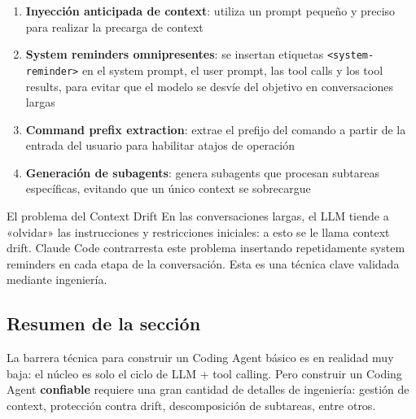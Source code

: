 \begin{enumerate}
    \item \textbf{Inyección anticipada de context}: utiliza un prompt pequeño y preciso para realizar la precarga de context
    \item \textbf{System reminders omnipresentes}: se insertan etiquetas \texttt{<system-reminder>} en el system prompt, el user prompt, las tool calls y los tool results, para evitar que el modelo se desvíe del objetivo en conversaciones largas
    \item \textbf{Command prefix extraction}: extrae el prefijo del comando a partir de la entrada del usuario para habilitar atajos de operación
    \item \textbf{Generación de subagents}: genera subagents que procesan subtareas específicas, evitando que un único context se sobrecargue
\end{enumerate}

\begin{warningbox}{El problema del Context Drift}
En las conversaciones largas, el LLM tiende a «olvidar» las instrucciones y restricciones iniciales: a esto se le llama context drift. Claude Code contrarresta este problema insertando repetidamente system reminders en cada etapa de la conversación. Esta es una técnica clave validada mediante ingeniería.
\end{warningbox}

\subsection{Resumen de la sección}

La barrera técnica para construir un Coding Agent básico es en realidad muy baja: el núcleo es solo el ciclo de LLM + tool calling. Pero construir un Coding Agent \textbf{confiable} requiere una gran cantidad de detalles de ingeniería: gestión de context, protección contra drift, descomposición de subtareas, entre otros.

